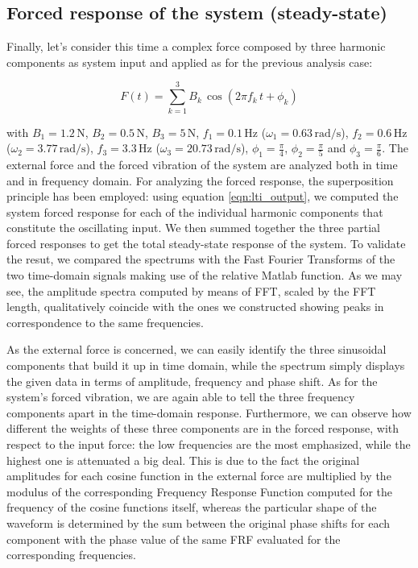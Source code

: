 \documentclass[a4paper,12pt,oneside]{article}
\begin{document}
\clearpage

\subsection{Forced response of the system (steady-state)}

Finally, let's consider this time a complex force composed by three harmonic components as system input and applied as for the previous analysis case:

\[ F(t) = \sum_{k=1}^3 B_k \, \cos(2 \pi f_k \, t + \phi_k) \]

with $ B_1 = 1.2 \, \text{N} $, $ B_2 = 0.5 \, \text{N} $, $ B_3 = 5 \, \text{N} $, $ f_1 = 0.1 \, \text{Hz} $ ($ \omega_1 = 0.63 \, \text{rad/s} $), $ f_2 = 0.6 \, \text{Hz} $ ($ \omega_2 = 3.77 \, \text{rad/s} $), $ f_3 = 3.3 \, \text{Hz} $ ($ \omega_3 = 20.73 \, \text{rad/s} $), $ \phi_1 = \frac{\pi}{4} $, $ \phi_2 = \frac{\pi}{5} $ and $ \phi_3 = \frac{\pi}{6} $. The external force and the forced vibration of the system are analyzed both in time and in frequency domain. For analyzing the forced response, the superposition principle has been employed: using equation \eqref{eqn:lti_output}, we computed the system forced response for each of the individual harmonic components that constitute the oscillating input. We then summed together the three partial forced responses to get the total steady-state response of the system. To validate the resut, we compared the spectrums with the Fast Fourier Transforms of the two time-domain signals making use of the relative Matlab function. As we may see, the amplitude spectra computed by means of FFT, scaled by the FFT length, qualitatively coincide with the ones we constructed showing peaks in correspondence to the same frequencies.

As the external force is concerned, we can easily identify the three sinusoidal components that build it up in time domain, while the spectrum simply displays the given data in terms of amplitude, frequency and phase shift. As for the system's forced vibration, we are again able to tell the three frequency components apart in the time-domain response. Furthermore, we can observe how different the weights of these three components are in the forced response, with respect to the input force: the low frequencies are the most emphasized, while the highest one is attenuated a big deal. This is due to the fact the original amplitudes for each cosine function in the external force are multiplied by the modulus of the corresponding Frequency Response Function computed for the frequency of the cosine functions itself, whereas the particular shape of the waveform is determined by the sum between the original phase shifts for each component with the phase value of the same FRF evaluated for the corresponding frequencies.
\end{document}
